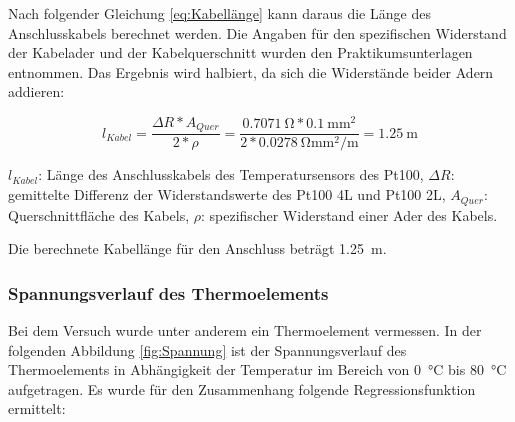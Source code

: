 Nach folgender Gleichung \ref{eq:Kabellänge} kann daraus die Länge des Anschlusskabels berechnet werden. Die Angaben für den spezifischen Widerstand der Kabelader und der Kabelquerschnitt wurden den Praktikumsunterlagen entnommen. Das Ergebnis wird halbiert, da sich die Widerstände beider Adern addieren:

\begin{equation}
\label{eq:Kabellänge}
l_{Kabel}= \frac{\Delta R*A_{Quer}}{2*\rho}=\frac{\SI{0,7071}{\ohm}*\SI{0,1}{\milli\meter\squared}}{2*\SI{0,0278}{\ohm\milli\meter\squared\per\meter}}=\SI{1,25}{\meter}
\end{equation}

\begin{center}
	\begin{small}
		$l_{Kabel}$: Länge des Anschlusskabels des Temperatursensors des Pt100,
		$\Delta R$: gemittelte Differenz der Widerstandswerte des Pt100 4L und Pt100 2L,
		$A_{Quer}$: Querschnittfläche des Kabels,
		$\rho$: spezifischer Widerstand einer Ader des Kabels.
	\end{small}
\end{center}

Die berechnete Kabellänge für den Anschluss beträgt \SI{1,25}{\meter}.

\subsubsection{Spannungsverlauf des Thermoelements}

Bei dem Versuch wurde unter anderem ein Thermoelement vermessen. In der folgenden Abbildung \ref{fig:Spannung} ist der Spannungsverlauf des Thermoelements in Abhängigkeit der Temperatur im Bereich von \SI{0}{\celsius} bis \SI{80}{\celsius} aufgetragen. Es wurde für den Zusammenhang folgende Regressionsfunktion ermittelt:
	
